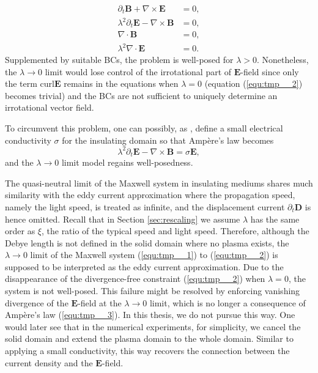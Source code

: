 \documentclass{report}
\begin{document}
\begin{align}
    \partial_t \mathbf{B} + \nabla \times \mathbf{E} &= 0, \label{equ:tmp__1}\\ 
    \lambda^2 \partial_t \mathbf{E} - \nabla \times \mathbf{B} &= 0,  \label{equ:tmp__3}\\
    \nabla \cdot \mathbf{B} &= 0, \\
    \lambda^2 \nabla \cdot \mathbf{E} &= 0 \label{equ:tmp__2}.
\end{align}
Supplemented by suitable BCs, the problem is well-posed for $\lambda > 0$. Nonetheless, the $\lambda \rightarrow 0$ limit would lose control of the irrotational part of $\mathbf{E}$-field since only the term curl$\mathbf{E}$ remains in the equations when $\lambda = 0$ (equation (\ref{equ:tmp__2}) becomes trivial) and the BCs are not sufficient to uniquely determine an irrotational vector field. 

To circumvent this problem, one can possibly, as \cite{fuchs_2021}, define a small electrical conductivity $\sigma$ for the insulating domain so that Amp\`{e}re's law becomes
\begin{equation*}
    \lambda^2 \partial_t \mathbf{E} - \nabla \times \mathbf{B} = \sigma\mathbf{E},
\end{equation*}
and the $\lambda \rightarrow 0$ limit model regains well-posedness.

The quasi-neutral limit of the Maxwell system in insulating mediums shares much similarity with the eddy current approximation where the propagation speed, namely the light speed, is treated as infinite, and the displacement current $\partial_t\mathbf{D}$ is hence omitted. Recall that in Section \ref{sec:rescaling} we assume $\lambda$ has the same order as $\xi$, the ratio of the typical speed and light speed. Therefore, although the Debye length is not defined in the solid domain where no plasma exists, the $\lambda \rightarrow 0$ limit of the Maxwell system (\ref{equ:tmp__1}) to (\ref{equ:tmp__2}) is supposed to be interpreted as the eddy current approximation. Due to the disappearance of the divergence-free constraint (\ref{equ:tmp__2}) when $\lambda = 0$, the system is not well-posed. This failure might be resolved by enforcing vanishing divergence of the $\mathbf{E}$-field at the $\lambda \rightarrow 0$ limit, which is no longer a consequence of Amp\`{e}re's law (\ref{equ:tmp__3}). In this thesis, we do not pursue this way. One would later see that in the numerical experiments, for simplicity, we cancel the solid domain and extend the plasma domain to the whole domain. Similar to applying a small conductivity, this way recovers the connection between the current density and the $\mathbf{E}$-field.  
\end{document}
